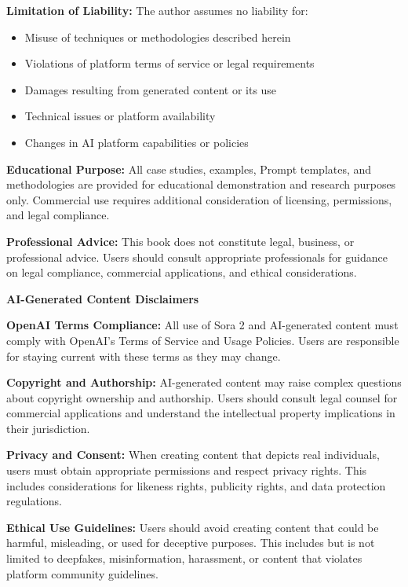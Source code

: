 \documentclass[11pt,a4paper,openright]{book}
\begin{document}
\textbf{Limitation of Liability:} The author assumes no liability for:
\begin{itemize}
\item Misuse of techniques or methodologies described herein
\item Violations of platform terms of service or legal requirements
\item Damages resulting from generated content or its use
\item Technical issues or platform availability
\item Changes in AI platform capabilities or policies
\end{itemize}

\textbf{Educational Purpose:} All case studies, examples, Prompt templates, and methodologies are provided for educational demonstration and research purposes only. Commercial use requires additional consideration of licensing, permissions, and legal compliance.

\textbf{Professional Advice:} This book does not constitute legal, business, or professional advice. Users should consult appropriate professionals for guidance on legal compliance, commercial applications, and ethical considerations.

\vspace{0.5cm}

\textbf{AI-Generated Content Disclaimers}

\textbf{OpenAI Terms Compliance:} All use of Sora 2 and AI-generated content must comply with OpenAI's Terms of Service and Usage Policies. Users are responsible for staying current with these terms as they may change.

\textbf{Copyright and Authorship:} AI-generated content may raise complex questions about copyright ownership and authorship. Users should consult legal counsel for commercial applications and understand the intellectual property implications in their jurisdiction.

\textbf{Privacy and Consent:} When creating content that depicts real individuals, users must obtain appropriate permissions and respect privacy rights. This includes considerations for likeness rights, publicity rights, and data protection regulations.

\textbf{Ethical Use Guidelines:} Users should avoid creating content that could be harmful, misleading, or used for deceptive purposes. This includes but is not limited to deepfakes, misinformation, harassment, or content that violates platform community guidelines.
\end{document}

